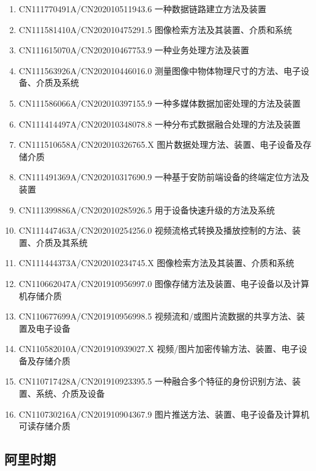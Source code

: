 \documentclass[scheme=plain]{ctexart}
\begin{document}
\begin{enumerate}
    \item CN111770491A/CN202010511943.6 一种数据链路建立方法及装置
    \item CN111581410A/CN202010475291.5 图像检索方法及其装置、介质和系统
    \item CN111615070A/CN202010467753.9 一种业务处理方法及装置
    \item CN111563926A/CN202010446016.0 测量图像中物体物理尺寸的方法、电子设备、介质及系统
    \item CN111586066A/CN202010397155.9 一种多媒体数据加密处理的方法及装置
    \item CN111414497A/CN202010348078.8 一种分布式数据融合处理的方法及装置
    \item CN111510658A/CN202010326765.X 图片数据处理方法、装置、电子设备及存储介质
    \item CN111491369A/CN202010317690.9 一种基于安防前端设备的终端定位方法及装置
    \item CN111399886A/CN202010285926.5 用于设备快速升级的方法及系统
    \item CN111447463A/CN202010254256.0 视频流格式转换及播放控制的方法、装置、介质及其系统
    \item CN111444373A/CN202010234745.X 图像检索方法及其装置、介质和系统
    \item CN110662047A/CN201910956997.0 图像存储方法及装置、电子设备以及计算机存储介质
    \item CN110677699A/CN201910956998.5 视频流和/或图片流数据的共享方法、装置及电子设备
    \item CN110582010A/CN201910939027.X 视频/图片加密传输方法、装置、电子设备及存储介质
    \item CN110717428A/CN201910923395.5 一种融合多个特征的身份识别方法、装置、系统、介质及设备
    \item CN110730216A/CN201910904367.9 图片推送方法、装置、电子设备及计算机可读存储介质
\end{enumerate}

\subsection*{阿里时期}
\end{document}
